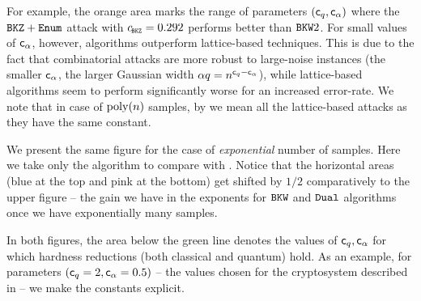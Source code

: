 For example, the orange area marks the range of \LWE parameters $(\mathsf{c}_q, \mathsf{c}_{\alpha})$ where the $\texttt{BKZ}+\texttt{Enum}$ attack with $\cBKZ = 0.292$ performs better than $\texttt{BKW}2$. For small values of $\mathsf{c}_{\alpha}$, however, \BKW algorithms outperform lattice-based techniques. This is due to the fact that combinatorial attacks are more robust to large-noise instances (the smaller $\mathsf{c}_{\alpha}$, the larger Gaussian width $\alpha q = n^{\mathsf{c}_q - \mathsf{c}_{\alpha}}$), while lattice-based algorithms seem to perform significantly worse for an increased error-rate. We note that in case of $\mathrm{poly}(n)$ samples, by \ENUM we mean all the lattice-based attacks as they have the same constant.

We present the same figure for the case of \emph{exponential} number of samples. Here we take only the \DUAL algorithm to compare with \BKW. Notice that the horizontal areas (blue at the top and pink at the bottom) get shifted by $1/2$ comparatively to the upper figure -- the gain we have in the exponents for $\texttt{BKW}$ and $\texttt{Dual}$ algorithms once we have exponentially many samples.

In both figures, the area below the green line denotes the values of $\mathsf{c}_q, \mathsf{c}_{\alpha}$ for which hardness reductions (both classical and quantum) hold. As an example, for parameters $(\mathsf{c}_q=2, \mathsf{c}_{\alpha} = 0.5)$ -- the values chosen for the cryptosystem described in \cite{STOC:Regev05} -- we make the constants explicit. 

%
%

